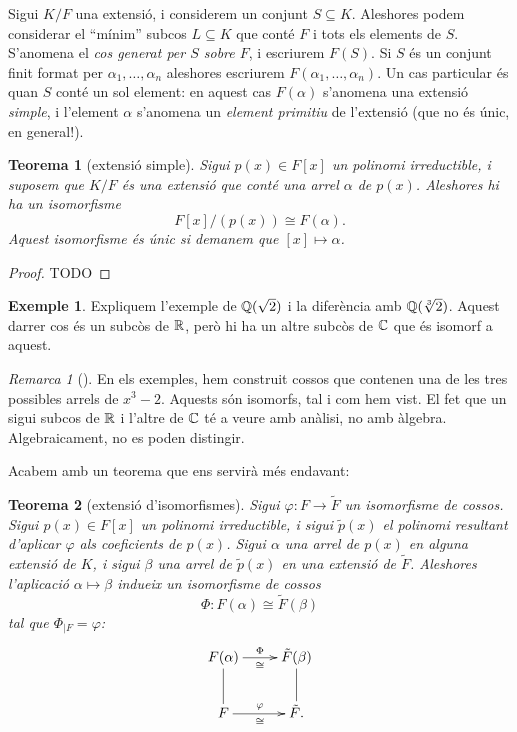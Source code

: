\documentclass[
]{book}
\newtheorem{theorem}{Teorema}[chapter]
\theoremstyle{definition}
\theoremstyle{definition}
\newtheorem{example}{Exemple}[chapter]
\theoremstyle{definition}
\theoremstyle{definition}
\theoremstyle{remark}
\newtheorem*{remark}{Remarca}
\begin{document}
Sigui \(K/F\) una extensió, i considerem un conjunt \(S\subseteq K\). Aleshores podem considerar el ``mínim'' subcos \(L\subseteq K\)
que conté \(F\) i tots els elements de \(S\). S'anomena el \emph{cos generat per \(S\) sobre \(F\)}, i escriurem \(F(S)\). Si \(S\) és un
conjunt finit format per \(\alpha_1,\ldots,\alpha_n\) aleshores escriurem \(F(\alpha_1,\ldots,\alpha_n)\). Un cas particular
és quan \(S\) conté un sol element: en aquest cas \(F(\alpha)\) s'anomena una extensió \emph{simple}, i l'element \(\alpha\) s'anomena
un \emph{element primitiu} de l'extensió (que no és únic, en general!).

\begin{theorem}[extensió simple]
\protect\hypertarget{thm:ext-simple}{}\label{thm:ext-simple}Sigui \(p(x)\in F[x]\) un polinomi irreductible, i suposem que \(K/F\) és una extensió que conté una arrel \(\alpha\) de \(p(x)\).
Aleshores hi ha un isomorfisme \[F[x]/(p(x))\cong F(\alpha).\]
Aquest isomorfisme és únic si demanem que \([x]\mapsto \alpha\).
\end{theorem}

\begin{proof}
TODO
\end{proof}

\begin{example}
Expliquem l'exemple de \(\mathbb{Q}(\sqrt{2})\) i la diferència amb \(\mathbb{Q}(\sqrt[3]{2})\). Aquest darrer cos és un subcòs de \(\mathbb{R}\), però hi ha
un altre subcòs de \(\mathbb{C}\) que és isomorf a aquest.
\end{example}

\begin{remark}[]
En els exemples, hem construit cossos que contenen una de les tres possibles arrels de \(x^3-2\). Aquests són isomorfs, tal
i com hem vist. El fet que un sigui subcos de \(\mathbb{R}\) i l'altre de \(\mathbb{C}\) té a veure amb anàlisi, no amb àlgebra. Algebraicament,
no es poden distingir.
\end{remark}

Acabem amb un teorema que ens servirà més endavant:

\begin{theorem}[extensió d'isomorfismes]
Sigui \(\varphi\colon F\to \tilde F\) un isomorfisme de cossos. Sigui \(p(x)\in F[x]\) un polinomi irreductible,
i sigui \(\tilde p(x)\) el polinomi resultant d'aplicar \(\varphi\) als coeficients de \(p(x)\). Sigui \(\alpha\) una
arrel de \(p(x)\) en alguna extensió de \(K\), i sigui \(\beta\) una arrel de \(\tilde p(x)\) en una extensió de \(\tilde F\).
Aleshores l'aplicació \(\alpha\mapsto \beta\) indueix un isomorfisme de cossos
\[
\Phi\colon F(\alpha) \cong \tilde F(\beta)
\]
tal que \(\Phi_{| F} = \varphi\):
\[
\begin{xy}
\xymatrix{
  F(\alpha)\ar_{\cong}^{\Phi}[r]\ar@{-}[d] & \tilde F(\beta)\ar@{-}[d]\\
  F \ar_{\cong}^{\varphi}[r] & \tilde F.
}
\end{xy}
\]
\end{theorem}
\end{document}
